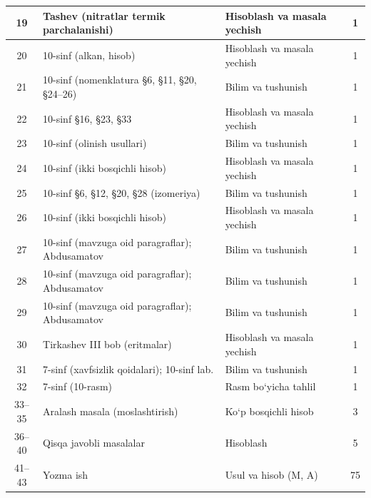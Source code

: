 \documentclass[11pt,a4paper]{article}
\begin{document}
{\begin{longtable}{|c|p{7.2cm}|p{5.4cm}|c|}
19 & Tashev (nitratlar termik parchalanishi) & Hisoblash va masala yechish & 1\\\hline
20 & 10-sinf (alkan, hisob) & Hisoblash va masala yechish & 1\\\hline
21 & 10-sinf (nomenklatura \S{}6, \S{}11, \S{}20, \S{}24--26) & Bilim va tushunish & 1\\\hline
22 & 10-sinf \S{}16, \S{}23, \S{}33 & Hisoblash va masala yechish & 1\\\hline
23 & 10-sinf (olinish usullari) & Bilim va tushunish & 1\\\hline
24 & 10-sinf (ikki bosqichli hisob) & Hisoblash va masala yechish & 1\\\hline
25 & 10-sinf \S{}6, \S{}12, \S{}20, \S{}28 (izomeriya) & Bilim va tushunish & 1\\\hline
26 & 10-sinf (ikki bosqichli hisob) & Hisoblash va masala yechish & 1\\\hline
27 & 10-sinf (mavzuga oid paragraflar); Abdusamatov & Bilim va tushunish & 1\\\hline
28 & 10-sinf (mavzuga oid paragraflar); Abdusamatov & Bilim va tushunish & 1\\\hline
29 & 10-sinf (mavzuga oid paragraflar); Abdusamatov & Bilim va tushunish & 1\\\hline
30 & Tirkashev III bob (eritmalar) & Hisoblash va masala yechish & 1\\\hline
31 & 7-sinf (xavfsizlik qoidalari); 10-sinf lab. & Bilim va tushunish & 1\\\hline
32 & 7-sinf (10-rasm) & Rasm bo`yicha tahlil & 1\\\hline
33--35 & Aralash masala (moslashtirish) & Ko`p bosqichli hisob & 3\\\hline
36--40 & Qisqa javobli masalalar & Hisoblash & 5\\\hline
41--43 & Yozma ish & Usul va hisob (M, A) & 75\\\hline
\end{longtable}}
\end{document}

